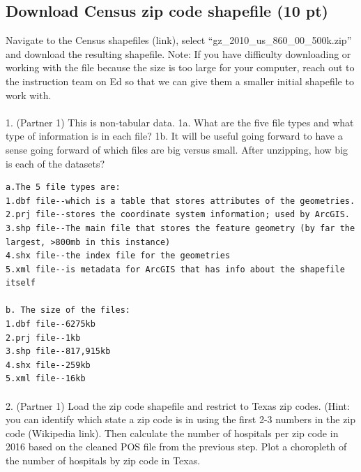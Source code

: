 \documentclass[
  letterpaper,
  DIV=11,
  numbers=noendperiod]{scrartcl}
\makeatletter
\let\oldparagraph\paragraph
\renewcommand{\paragraph}{
    \@ifstar
      \xxxParagraphStar
      \xxxParagraphNoStar
  }
\newcommand{\xxxParagraphStar}[1]{\oldparagraph*{#1}\mbox{}}
\newcommand{\xxxParagraphNoStar}[1]{\oldparagraph{#1}\mbox{}}
\makeatother
\begin{document}
\subsection{Download Census zip code shapefile (10
pt)}\label{download-census-zip-code-shapefile-10-pt}

Navigate to the Census shapefiles (link), select
``gz\_2010\_us\_860\_00\_500k.zip'' and download the resulting
shapefile. Note: If you have difficulty downloading or working with the
file because the size is too large for your computer, reach out to the
instruction team on Ed so that we can give them a smaller initial
shapefile to work with.

\paragraph{1. (Partner 1) This is non-tabular data. 1a. What are the
five file types and what type of information is in each file? 1b. It
will be useful going forward to have a sense going forward of which
files are big versus small. After unzipping, how big is each of the
datasets?}\label{partner-1-this-is-non-tabular-data.-1a.-what-are-the-five-file-types-and-what-type-of-information-is-in-each-file-1b.-it-will-be-useful-going-forward-to-have-a-sense-going-forward-of-which-files-are-big-versus-small.-after-unzipping-how-big-is-each-of-the-datasets}

\begin{verbatim}
a.The 5 file types are: 
1.dbf file--which is a table that stores attributes of the geometries. 
2.prj file--stores the coordinate system information; used by ArcGIS.
3.shp file--The main file that stores the feature geometry (by far the largest, >800mb in this instance)
4.shx file--the index file for the geometries
5.xml file--is metadata for ArcGIS that has info about the shapefile itself

b. The size of the files:
1.dbf file--6275kb
2.prj file--1kb
3.shp file--817,915kb
4.shx file--259kb
5.xml file--16kb
\end{verbatim}

\paragraph{2. (Partner 1) Load the zip code shapefile and restrict to
Texas zip codes. (Hint: you can identify which state a zip code is in
using the first 2-3 numbers in the zip code (Wikipedia link). Then
calculate the number of hospitals per zip code in 2016 based on the
cleaned POS file from the previous step. Plot a choropleth of the number
of hospitals by zip code in
Texas.}\label{partner-1-load-the-zip-code-shapefile-and-restrict-to-texas-zip-codes.-hint-you-can-identify-which-state-a-zip-code-is-in-using-the-first-2-3-numbers-in-the-zip-code-wikipedia-link.-then-calculate-the-number-of-hospitals-per-zip-code-in-2016-based-on-the-cleaned-pos-file-from-the-previous-step.-plot-a-choropleth-of-the-number-of-hospitals-by-zip-code-in-texas.}
\end{document}
